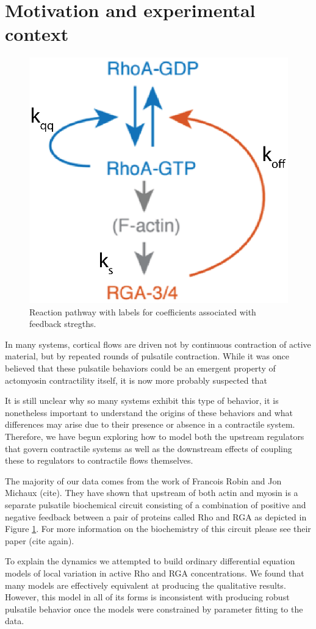 \section{Motivation and experimental context}
\begin{figure}[h!]
	\centering
	\includegraphics[width=0.5\hsize]{pulse/diagram_eq.eps}
	\caption{\label{fig:pulse_diag}  Reaction pathway with labels for coefficients associated with feedback stregths.}
\end{figure}

In many systems, cortical flows are driven not by continuous contraction of active material, but by repeated rounds of pulsatile contraction.  While it was once believed that these pulsatile behaviors could be an emergent property of actomyosin contractility itself, it is now more probably suspected that 

It is still unclear why so many systems exhibit this type of behavior, it is nonetheless important to understand the origins of these behaviors and what differences may arise due to their presence or absence in a contractile system.  Therefore, we have begun exploring how to model both the upstream regulators that govern contractile systems as well as the downstream effects of coupling these to regulators to contractile flows themselves.

The majority of our data comes from the work of Francois Robin and Jon Michaux (cite).  They have shown that upstream of both actin and myosin is a separate pulsatile biochemical circuit consisting of a combination of positive and negative feedback between a pair of proteins called Rho and RGA as depicted in Figure \ref{fig:pulse_diag}.  For more information on the biochemistry of this circuit please see their paper (cite again).  

To explain the dynamics we attempted to build ordinary differential equation models of local variation in active Rho and RGA concentrations.  We found that many models are effectively equivalent at producing the qualitative results.  However, this model in all of its forms is inconsistent with producing robust pulsatile behavior once the models were constrained by parameter fitting to the data. 

